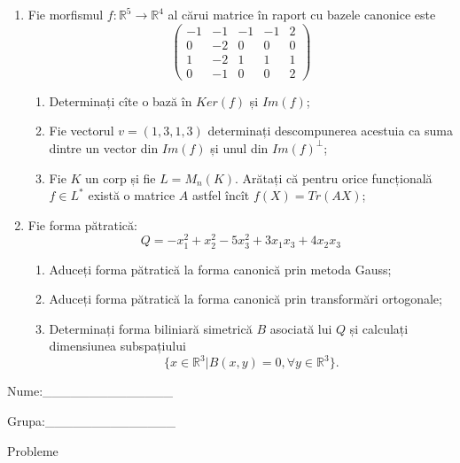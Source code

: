 \documentclass{article}
\begin{document}
\begin{enumerate}
 \item Fie morfismul $f:\mathbb{R}^5 \to \mathbb{R}^4$ al cărui matrice în raport cu bazele canonice este
$$\begin{pmatrix}
-1&-1&-1&-1&2\\
0&-2&0&0&0\\
1&-2&1&1&1\\
0&-1&0&0&2
\end{pmatrix}$$

\begin{enumerate}
\item Determinați cîte o bază în $Ker(f)$ și $Im(f)$;
\item Fie vectorul $v=(1,3,1,3)$ determinați descompunerea acestuia ca suma dintre un vector din $Im(f)$ și unul din $Im(f)^\perp$;
\item Fie $K$ un corp și fie $L=M_n(K)$. Arătați că pentru orice funcțională $f \in L^*$ există o matrice $A$ astfel încît $f(X)=Tr(AX)$;
\end{enumerate}
\item Fie forma pătratică:
$$Q= -x_1^2+x_2^2-5x_3^2+3x_1x_3+4x_2x_3$$

\begin{enumerate}
\item Aduceți forma pătratică la forma canonică prin metoda Gauss;
\item Aduceți forma pătratică la forma canonică prin transformări ortogonale;
\item Determinați forma biliniară simetrică $B$ asociată lui $Q$ și calculați dimensiunea subspațiului
$$\{x \in \mathbb{R}^3 | B(x,y)=0,\forall y \in \mathbb{R}^3\}.$$

\end{enumerate}
\end{enumerate}
\newpage
\begin{flushright}
Nume:\_\_\_\_\_\_\_\_\_\_\_\_\_\_
 
 
Grupa:\_\_\_\_\_\_\_\_\_\_\_\_\_\_
\end{flushright}
\begin{center}
\vspace{2cm}
{\Large Probleme}
\vspace{2cm}
\end{center}
\end{document}
